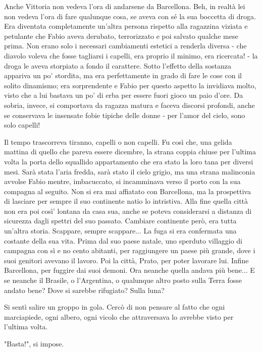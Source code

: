Anche Vittoria non vedeva l'ora di andarsene da Barcellona. Beh, in realtà lei non vedeva l'ora di fare qualunque cosa, se aveva con sé la sua boccetta di droga. Era diventata completamente un'altra persona rispetto alla ragazzina viziata e petulante che Fabio aveva derubato, terrorizzato e poi salvato qualche mese prima. Non erano solo i necessari cambiamenti estetici a renderla diversa - che diavolo voleva che fosse tagliarsi i capelli, era proprio il minimo, era ricercata! - la droga le aveva storpiato a fondo il carattere. Sotto l'effetto della sostanza appariva un po' stordita, ma era perfettamente in grado di fare le cose con il solito dinamismo; era sorprendente e Fabio per questo aspetto la invidiava molto, visto che a lui bastava un po' di erba per essere fuori gioco un paio d'ore. Da sobria, invece, si comportava da ragazza matura e faceva discorsi profondi, anche se conservava le insensate fobie tipiche delle donne - per l'amor del cielo, sono solo capelli!

Il tempo trascorreva tiranno, capelli o non capelli. Fu così che, una gelida mattina di quello che pareva essere dicembre, la strana coppia chiuse per l'ultima volta la porta dello squallido appartamento che era stato la loro tana per diversi mesi. Sarà stata l'aria fredda, sarà stato il cielo grigio, ma una strana malinconia avvolse Fabio mentre, imbacuccato, si incamminava verso il porto con la sua compagna al seguito. Non si era mai affiatato con Barcellona, ma la prospettiva di lasciare per sempre il suo continente natio lo intristiva. Alla fine quella città non era poi così' lontana da casa sua, anche se poteva considerarsi a distanza di sicurezza dagli spettri del suo passato. Cambiare continente però, era tutta un'altra storia. Scappare, sempre scappare... La fuga si era confermata una costante della sua vita. Prima dal suo paese natale, uno sperduto villaggio di campagna con sì e no cento abitanti, per raggiungere un paese più grande, dove i suoi genitori avevano il lavoro. Poi la città, Prato, per poter lavorare lui. Infine Barcellona, per fuggire dai suoi demoni. Ora neanche quella andava più bene... E se neanche il Brasile, o l'Argentina, o qualunque altro posto sulla Terra fosse andato bene? Dove si sarebbe rifugiato? Sulla luna?

Si sentì salire un groppo in gola. Cercò di non pensare al fatto che ogni marciapiede, ogni albero, ogni vicolo che attraversava lo avrebbe visto per l'ultima volta.

"Basta!", si impose.

